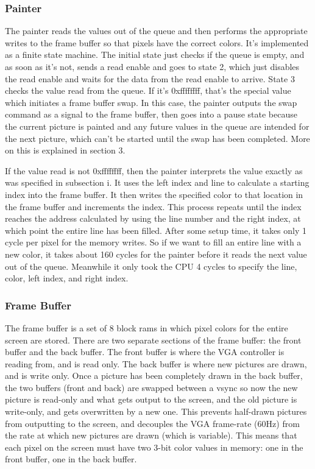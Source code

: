 \documentclass[onecolumn]{IEEEtran}
\begin{document}
\subsubsection{Painter}
The painter reads the values out of the queue and then performs the appropriate writes to the frame buffer so that pixels have the correct colors.  It's implemented as a finite state machine.  The initial state just checks if the queue is empty, and as soon as it's not, sends a read enable and goes to state 2, which just disables the read enable and waits for the data from the read enable to arrive.  State 3 checks the value read from the queue.  If it's 0xffffffff, that's the special value which initiates a frame buffer swap.  In this case, the painter outputs the swap command as a signal to the frame buffer, then goes into a pause state because the current picture is painted and any future values in the queue are intended for the next picture, which can't be started until the swap has been completed.  More on this is explained in section 3.

If the value read is not 0xffffffff, then the painter interprets the value exactly as was specified in subsection i.  It uses the left index and line to calculate a starting index into the frame buffer.  It then writes the specified color to that location in the frame buffer and increments the index.  This process repeats until the index reaches the address calculated by using the line number and the right index, at which point the entire line has been filled.  After some setup time, it takes only 1 cycle per pixel for the memory writes.  So if we want to fill an entire line with a new color, it takes about 160 cycles for the painter before it reads the next value out of the queue.  Meanwhile it only took the CPU 4 cycles to specify the line, color, left index, and right index.

\subsubsection{Frame Buffer}
The frame buffer is a set of 8 block rams in which pixel colors for the entire screen are stored.  There are two separate sections of the frame buffer: the front buffer and the back buffer.  The front buffer is where the VGA controller is reading from, and is read only.  The back buffer is where new pictures are drawn, and is write only.  Once a picture has been completely drawn in the back buffer, the two buffers (front and back) are swapped between a vsync so now the new picture is read-only and what gets output to the screen, and the old picture is write-only, and gets overwritten by a new one.  This prevents half-drawn pictures from outputting to the screen, and decouples the VGA frame-rate (60Hz) from the rate at which new pictures are drawn (which is variable).  This means that each pixel on the screen must have two 3-bit color values in memory: one in the front buffer, one in the back buffer.  
\end{document}
